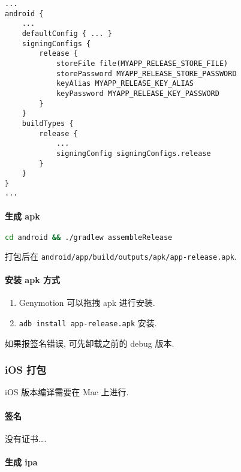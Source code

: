 \begin{lstlisting}
...
android {
    ...
    defaultConfig { ... }
    signingConfigs {
        release {
            storeFile file(MYAPP_RELEASE_STORE_FILE)
            storePassword MYAPP_RELEASE_STORE_PASSWORD
            keyAlias MYAPP_RELEASE_KEY_ALIAS
            keyPassword MYAPP_RELEASE_KEY_PASSWORD
        }
    }
    buildTypes {
        release {
            ...
            signingConfig signingConfigs.release
        }
    }
}
...
\end{lstlisting}

\paragraph{生成 apk}\label{ux751fux6210-apk}

\begin{lstlisting}[language=bash]
cd android && ./gradlew assembleRelease
\end{lstlisting}

打包后在 \lstinline!android/app/build/outputs/apk/app-release.apk!.

\paragraph{安装 apk 方式}\label{ux5b89ux88c5-apk-ux65b9ux5f0f}

\begin{enumerate}
\def\labelenumi{\arabic{enumi}.}
\tightlist
\item
  Genymotion 可以拖拽 apk 进行安装.
\item
  \lstinline!adb install app-release.apk! 安装.
\end{enumerate}

如果报签名错误, 可先卸载之前的 debug 版本.

\subsubsection{iOS 打包}\label{ios-ux6253ux5305}

iOS 版本编译需要在 Mac 上进行.

\paragraph{签名}\label{ux7b7eux540d}

没有证书\ldots{}.

\paragraph{生成 ipa}\label{ux751fux6210-ipa}

